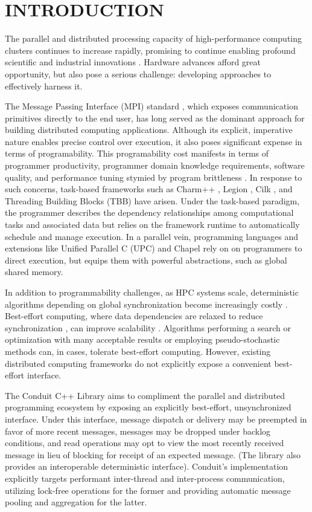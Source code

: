 \section{INTRODUCTION}

The parallel and distributed processing capacity of high-performance computing clusters continues to increase rapidly, promising to continue enabling profound scientific and industrial innovations \cite{gagliardi2019international}.    
Hardware advances afford great opportunity, but also pose a serious challenge: developing approaches to effectively harness it.

The Message Passing Interface (MPI) standard \cite{gropp1996high}, which exposes communication primitives directly to the end user, has long served as the dominant approach for building distributed computing applications.
Although its explicit, imperative nature enables precise control over execution, it also poses significant expense in terms of programability.
This programability cost manifests in terms of programmer productivity, programmer domain knowledge requirements, software quality, and performance tuning stymied by program brittleness \cite{gu2019comparative, tang2014mpi}.
In response to such concerns, task-based frameworks such as Charm++ \cite{kale1993charm++}, Legion \cite{bauer2012legion}, Cilk \cite{blumofe1996cilk}, and Threading Building Blocks (TBB) \cite{reinders2007intel} have arisen.
Under the task-based paradigm, the programmer describes the dependency relationships among computational tasks and associated data but relies on the framework runtime to automatically schedule and manage execution.
In a parallel vein, programming languages and extensions like Unified Parallel C (UPC) \cite{el2006upc} and Chapel \cite{chamberlain2007parallel} rely on on programmers to direct execution, but equips them with powerful abstractions, such as global shared memory.

In addition to programmability challenges, as HPC systems scale, deterministic algorithms depending on global synchronization become increasingly costly \cite{gropp2013programming,dongarra2014applied}.
Best-effort computing, where data dependencies are relaxed to reduce synchronization \cite{chakradhar2010best}, can improve scalability \cite{meng2009best}.
Algorithms performing a search or optimization with many acceptable results or employing pseudo-stochastic methods can, in cases, tolerate best-effort computing.
However, existing distributed computing frameworks do not explicitly expose a convenient best-effort interface.

The Conduit C++ Library aims to compliment the parallel and distributed programming ecosystem by exposing an explicitly best-effort, unsynchronized interface.
Under this interface, message dispatch or delivery may be preempted in favor of more recent messages, messages may be dropped under backlog conditions, and read operations may opt to view the most recently received message in lieu of blocking for receipt of an expected message.
(The library also provides an interoperable deterministic interface).
Conduit's implementation explicitly targets performant inter-thread and inter-process communication, utilizing lock-free operations for the former and providing automatic message pooling and aggregation for the latter.
